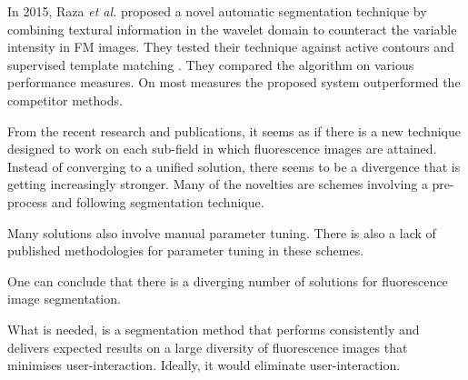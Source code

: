 \begin{definition}
	In 2015, Raza \textit{et al.} \cite{Raza2015} proposed a novel automatic segmentation technique by combining textural information in the wavelet domain to counteract the variable intensity in FM images. They tested their technique against active contours \cite{Bergeest2012} and supervised template matching \cite{Chen2013}. They compared the algorithm on various performance measures. On most measures the proposed system outperformed the competitor methods.
\end{definition}

\begin{definition}
	From the recent research and publications, it seems as if there is a new technique designed to work on each sub-field in which fluorescence images are attained. Instead of converging to a unified solution, there seems to be a divergence that is getting increasingly stronger.
	Many of the novelties are schemes involving a pre-process and following segmentation technique. 
	
	Many solutions also involve manual parameter tuning. There is also a lack of published methodologies for parameter tuning in these schemes.
	
	One can conclude that there is a diverging number of solutions for fluorescence image segmentation.
	
	What is needed, is a segmentation method that performs consistently and delivers expected results on a large diversity of fluorescence images that minimises user-interaction. Ideally, it would eliminate user-interaction.
\end{definition}












